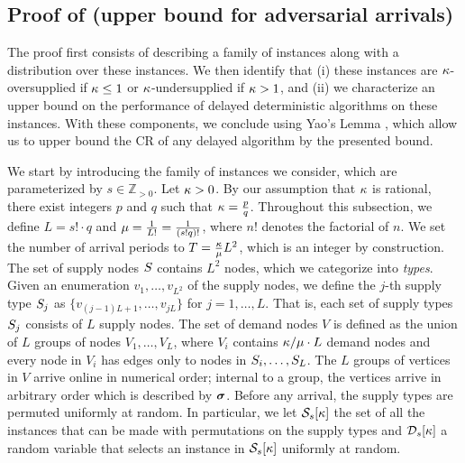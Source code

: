 \subsection*{Proof of  (upper bound for adversarial arrivals)}
\label{ssec: adversarial_impossibility}
The proof first consists of describing a family of instances along with a distribution over these instances. We then identify that (i) these instances are $\kappa$-oversupplied if $\kappa \leq 1$ or $\kappa$-undersupplied if $\kappa > 1$, and (ii) we characterize an upper bound on the performance of delayed deterministic algorithms on these instances. With these components, we conclude using Yao's Lemma \citep{yao1977probabilistic}, which allow us to upper bound the CR of any delayed algorithm by the presented bound. %


We start by introducing the family of instances we consider, which are parameterized by $s \in \mathbb{Z}_{>0}$. Let $\kappa > 0$. By our assumption that $\kappa$ is rational, there exist integers $ p $ and $ q $ such that $ \kappa = \frac{p}{q} $. Throughout this subsection, we define $L = s! \cdot q $ and $ \mu = \frac{1}{L!}=\frac{1}{(s!q)!} $, where $ n!$ denotes the factorial of $ n $. We set the number of arrival periods to $ T = \frac{\kappa}{\mu} L^2 $, which is an integer by construction. The set of supply nodes $S$ contains $L^2$ nodes, which we categorize into \textit{types}. Given an enumeration $v_1, \ldots, v_{L^2}$ of the supply nodes, we define the $j$-th supply type $ S_j $ as $ \{ v_{(j-1)L+1}, \ldots, v_{jL} \} $ for $ j = 1, \ldots, L $. That is, each set of supply types $S_j$ consists of $L$ supply nodes.  The set of demand nodes $V$ is defined as the union of $L$ groups of nodes $V_1, \ldots, V_L$, where $ V_i $ contains $\kappa/\mu \cdot L $ demand nodes and every node in $ V_i $ has edges only to nodes in $ S_i, \ldots, S_L$. The $L$ groups of vertices in $V$ arrive online in numerical order; internal to a group, the vertices arrive in arbitrary order which is described by $\bm{\sigma}$. Before any arrival, the supply types are permuted uniformly at random. In particular, we let $\mathcal{S}_s[\kappa]$ the set of all the instances that can be made with permutations on the supply types and $\mathcal{D}_s[\kappa]$ a random variable that selects an instance in $\mathcal{S}_s[\kappa]$ %
uniformly at random.

